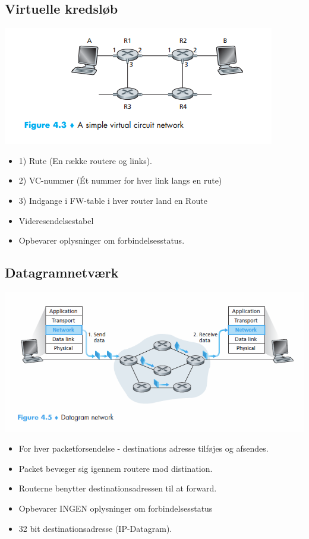 \subsection{Virtuelle kredsløb}
{\includegraphics{4-network-layer/vc-network.png}
\begin{itemize}
	\item 1) Rute (En række routere og links). 
	\item 2) VC-nummer (Ét nummer for hver link langs en rute)
	\item 3) Indgange i FW-table i hver router land en Route
	\item Videresendelsestabel
	\item Opbevarer oplysninger om forbindelsesstatus.
\end{itemize}

\subsection{Datagramnetværk}
{\includegraphics{4-network-layer/datagramnetwork.png}
\begin{itemize}
	\item For hver packetforsendelse - destinations adresse tilføjes og afsendes.
	\item Packet bevæger sig igennem routere mod distination.
	\item Routerne benytter destinationsadressen til at forward. 
	\item Opbevarer INGEN oplysninger om forbindelsesstatus
	\item 32 bit destinationsadresse (IP-Datagram).
\end{itemize}

}}

